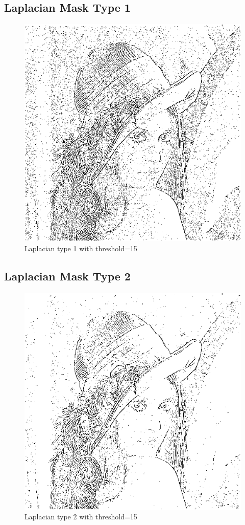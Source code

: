 \documentclass{article}
\begin{document}
\subsection{Laplacian Mask Type 1}
\begin{figure}[H]
  \includegraphics[width=\linewidth]{img/laplacian_1.png}
  \caption{Laplacian type 1 with threshold=15}
  \label{fig:laplacian_1}
\end{figure}

\subsection{Laplacian Mask Type 2}
\begin{figure}[H]
  \includegraphics[width=\linewidth]{img/laplacian_2.png}
  \caption{Laplacian type 2 with threshold=15}
  \label{fig:laplacian_2}
\end{figure}
\end{document}

